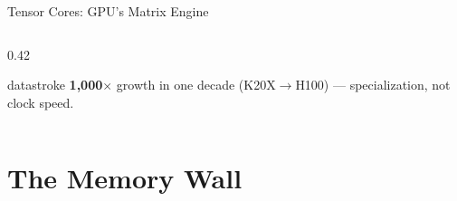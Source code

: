 \documentclass[aspectratio=169, 12pt]{beamer}
\begin{document}
\begin{frame}{Tensor Cores: GPU's Matrix Engine}
\begin{columns}[T]
\begin{column}{0.42\textwidth}
    \vspace{0.1cm}
    \begin{mlsyscard}{datastroke}
    {\scriptsize \textbf{1,000$\times$} growth in one decade (K20X$\to$H100) --- specialization, not clock speed.}
    \end{mlsyscard}
  \end{column}
\end{columns}

\end{frame}

\section{The Memory Wall}

\end{document}
